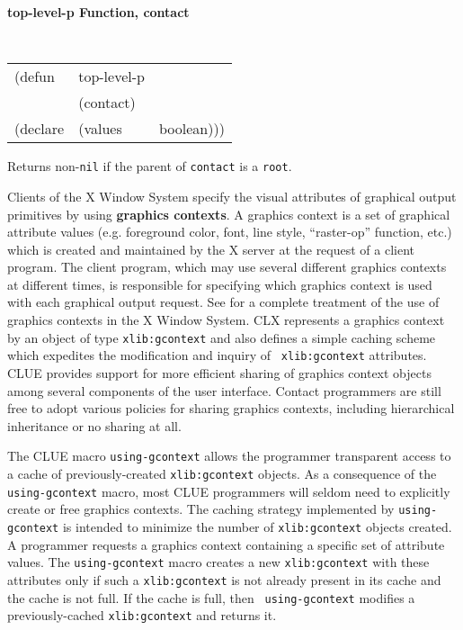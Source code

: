 \documentclass[twoside]{book}
\begin{document}
\begin{sloppy}
{\samepage
{\large {\bf top-level-p \hfill Function, contact}} 
\begin{flushright} \parbox[t]{6.125in}{
\tt
\begin{tabular}{lll}
\raggedright
(defun & top-level-p & \\ 
& (contact) \\
(declare &(values  & boolean)))
\end{tabular}
\rm

}\end{flushright}}

\begin{flushright} \parbox[t]{6.125in}{
Returns non-{\tt nil} if the parent of {\tt contact} is a {\tt root}.

}\end{flushright}


Clients of the X Window System
specify the visual attributes of graphical output primitives by using
{\bf graphics contexts}.
A graphics context is a set of graphical attribute values (e.g.
foreground color, font, line style, ``raster-op'' function, etc.) which
is created and maintained by the X server at the request of a client
program. The client program, which may use several different graphics
contexts at different times, is responsible for specifying which
graphics context is used with each graphical output request. See
\cite{x-protocol} for a complete treatment of the use of graphics
contexts in the X Window System. CLX\cite{clx} represents a graphics context by an
object of type {\tt xlib:gcontext} and also defines a simple caching
scheme which expedites the modification and inquiry of {\tt
xlib:gcontext} attributes.
CLUE provides support for more efficient sharing of graphics context
objects among several components of the user interface. Contact
programmers are still free to adopt various policies for sharing
graphics contexts, including hierarchical inheritance or no sharing at
all.

The CLUE macro {\tt using-gcontext} allows the programmer transparent
access to a cache of previously-created {\tt xlib:gcontext} objects. As
a consequence of the {\tt using-gcontext} macro, most CLUE programmers
will seldom need to explicitly create or free graphics contexts. 
The caching strategy implemented by {\tt using-gcontext} is intended to
minimize the number of {\tt xlib:gcontext} objects created. A programmer
requests a graphics context containing a specific set of attribute
values. The {\tt using-gcontext} macro creates a new {\tt xlib:gcontext}
with these attributes only if such a {\tt xlib:gcontext} is not already
present in its cache and the cache is not full. If the cache is full, then {\tt
using-gcontext} modifies a previously-cached {\tt xlib:gcontext} and returns
it.


\end{sloppy}
\end{document}

